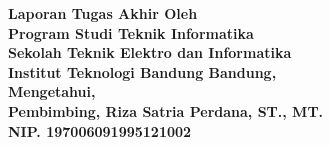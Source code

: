 \clearpage
\pagestyle{empty}

\begin{center}
\smallskip
    \Large \bfseries \MakeUppercase{\thetitle}
    \vfill
    \Large Laporan Tugas Akhir
    \vfill
    \large Oleh
    \Large \uppercase{\theauthor} \\
    \large Program Studi Teknik Informatika \\ Sekolah Teknik Elektro dan Informatika \\ Institut Teknologi Bandung
    \vfill
    \normalsize \normalfont
    \vfill
    Bandung, \thedate \\
    Mengetahui, \\
    Pembimbing,
    \vfill
    \vfill
    \vfill
    Riza Satria Perdana, ST., MT. \\
    NIP. 197006091995121002
\end{center}
\clearpage
